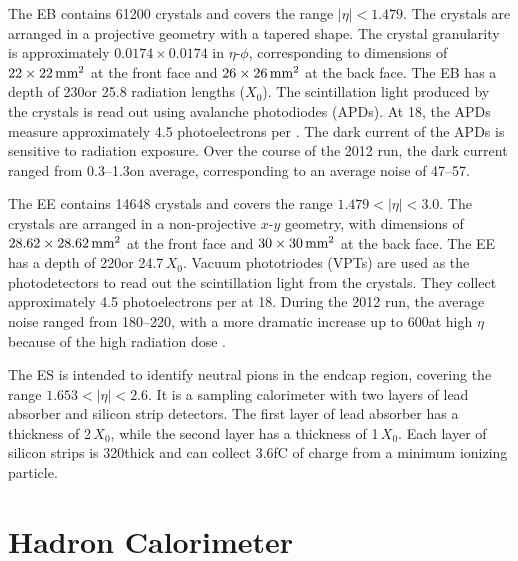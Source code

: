 The EB contains 61200 \pbwo crystals and covers the range $|\eta|<1.479$. The crystals are arranged in a projective geometry with a tapered shape. The crystal granularity is approximately $0.0174\times0.0174$ in $\eta$-$\phi$, corresponding to dimensions of $22\times22\,\text{mm}^{2}$ at the front face and $26\times26\,\text{mm}^{2}$ at the back face. The EB has a depth of 230\mm or 25.8 radiation lengths ($X_{0}$). The scintillation light produced by the \pbwo crystals is read out using avalanche photodiodes (APDs). At 18\degC, the APDs measure approximately 4.5 photoelectrons per \MeVns. The dark current of the APDs is sensitive to radiation exposure. Over the course of the 2012 run, the dark current ranged from 0.3--1.3\muA on average, corresponding to an average noise of 47--57\MeV \cite{CMS:2013ecal}.

The EE contains 14648 \pbwo crystals and covers the range $1.479<|\eta|<3.0$. The crystals are arranged in a non-projective $x$-$y$ geometry, with dimensions of $28.62\times28.62\,\text{mm}^{2}$ at the front face and $30\times30\,\text{mm}^{2}$ at the back face. The EE has a depth of 220\mm or 24.7$\,X_{0}$. Vacuum phototriodes (VPTs) are used as the photodetectors to read out the scintillation light from the \pbwo crystals. They collect approximately 4.5 photoelectrons per \MeVns at 18\degC. During the 2012 run, the average noise ranged from 180--220\MeV, with a more dramatic increase up to 600\MeV at high $\eta$ because of the high radiation dose \cite{CMS:2013ecal}.

The ES is intended to identify neutral pions in the endcap region, covering the range $1.653<|\eta|<2.6$. It is a sampling calorimeter with two layers of lead absorber and silicon strip detectors. The first layer of lead absorber has a thickness of 2$\,X_{0}$, while the second layer has a thickness of 1$\,X_{0}$. Each layer of silicon strips is 320\mum thick and can collect 3.6\unit{fC} of charge from a minimum ionizing particle.


\section{Hadron Calorimeter}

